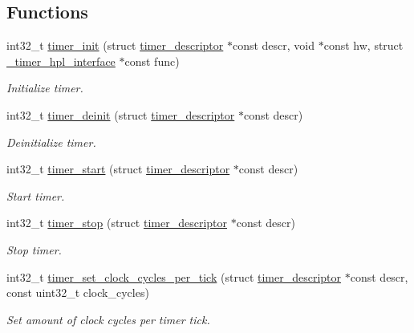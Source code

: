 \subsection*{Functions}
\begin{DoxyCompactItemize}
\item 
int32\+\_\+t \hyperlink{group__doc__driver__hal__timer_ga22db38dddbdcff5fef216fd5968c237d}{timer\+\_\+init} (struct \hyperlink{structtimer__descriptor}{timer\+\_\+descriptor} $\ast$const descr, void $\ast$const hw, struct \hyperlink{struct__timer__hpl__interface}{\+\_\+timer\+\_\+hpl\+\_\+interface} $\ast$const func)
\begin{DoxyCompactList}\small\item\em Initialize timer. \end{DoxyCompactList}\item 
int32\+\_\+t \hyperlink{group__doc__driver__hal__timer_gad507034c9221e87e6a7bbb737f697063}{timer\+\_\+deinit} (struct \hyperlink{structtimer__descriptor}{timer\+\_\+descriptor} $\ast$const descr)
\begin{DoxyCompactList}\small\item\em Deinitialize timer. \end{DoxyCompactList}\item 
int32\+\_\+t \hyperlink{group__doc__driver__hal__timer_ga462a0562dcbf75fce52d9b763ded6375}{timer\+\_\+start} (struct \hyperlink{structtimer__descriptor}{timer\+\_\+descriptor} $\ast$const descr)
\begin{DoxyCompactList}\small\item\em Start timer. \end{DoxyCompactList}\item 
int32\+\_\+t \hyperlink{group__doc__driver__hal__timer_gaeb44f8c22b1579586981522213a6df2b}{timer\+\_\+stop} (struct \hyperlink{structtimer__descriptor}{timer\+\_\+descriptor} $\ast$const descr)
\begin{DoxyCompactList}\small\item\em Stop timer. \end{DoxyCompactList}\item 
int32\+\_\+t \hyperlink{group__doc__driver__hal__timer_ga658e045e3dfdc01d14e09db3a1ff1eb7}{timer\+\_\+set\+\_\+clock\+\_\+cycles\+\_\+per\+\_\+tick} (struct \hyperlink{structtimer__descriptor}{timer\+\_\+descriptor} $\ast$const descr, const uint32\+\_\+t clock\+\_\+cycles)
\begin{DoxyCompactList}\small\item\em Set amount of clock cycles per timer tick. \end{DoxyCompactList}\item 

\end{DoxyCompactItemize}
